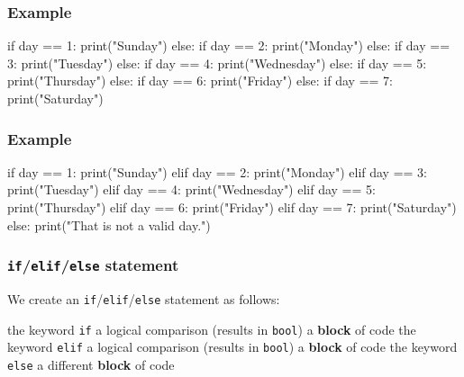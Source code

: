 \documentclass[11pt]{beamer}
\begin{document}
\begin{frame}[fragile]
  \frametitle{Example}
  \Enlarge

  \begin{semiverbatim}
if day == 1:
    print("Sunday")
else:
    if day == 2:
        print("Monday")
    else:
        if day == 3:
            print("Tuesday")
        else:
            if day == 4:
                print("Wednesday")
            else:
                if day == 5:
                    print("Thursday")
                else:
                    if day == 6:
                        print("Friday")
                    else:
                        if day == 7:
                            print("Saturday")
  \end{semiverbatim}
\end{frame}

\begin{frame}[fragile]
  \frametitle{Example}
  \Enlarge

  \begin{semiverbatim}
if day == 1:
    print("Sunday")
elif day == 2:
    print("Monday")
elif day == 3:
    print("Tuesday")
elif day == 4:
    print("Wednesday")
elif day == 5:
    print("Thursday")
elif day == 6:
    print("Friday")
elif day == 7:
    print("Saturday")
else:
    print("That is not a valid day.")
  \end{semiverbatim}
\end{frame}

\begin{frame}[fragile]
  \frametitle{\texttt{if}/\texttt{elif}/\texttt{else} statement}
  \Enlarge

  \begin{itemize}
  \myitem  We create an \texttt{if}/\texttt{elif}/\texttt{else} statement as follows:
    \begin{itemize}
    \mysubitem  the keyword \texttt{if}
    \mysubitem  a logical comparison (results in \texttt{bool})
    \mysubitem  a \textbf{block} of code
    \mysubitem  the keyword \texttt{elif}
    \mysubitem  a logical comparison (results in \texttt{bool})
    \mysubitem  a \textbf{block} of code
    \mysubitem  the keyword \texttt{else}
    \mysubitem  a different \textbf{block} of code
    \end{itemize}
  \end{itemize}
\end{frame}
\end{document}
